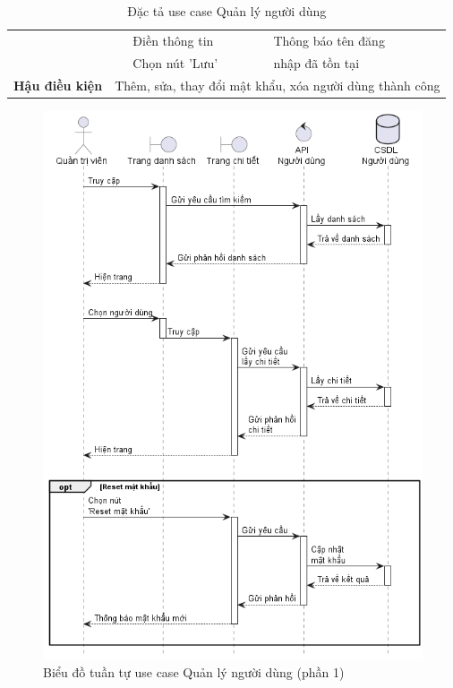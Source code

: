 \documentclass[../DoAn.tex]{subfiles}
\begin{document}
\begin{table}[H]
\begin{tabular}{|l|c|l|l|}
                                                 &                                                                              & Điền thông tin                            & Thông báo tên đăng                              \\
                                                 &                                                                              & Chọn nút 'Lưu'                            & nhập đã tồn tại                                 \\ \hline
        \textbf{Hậu điều kiện}                   & \multicolumn{3}{l|}{Thêm, sửa, thay đổi mật khẩu, xóa người dùng thành công}                                                                                               \\ \hline
    \end{tabular}
    \caption{Đặc tả use case Quản lý người dùng}
    \label{table:uc-user-manage}
\end{table}
\break

\begin{figure}[H]
    \centering
    \includegraphics[width=1\textwidth]{Hinhve/sequences/UserManage1.png}
    \caption{Biểu đồ tuần tự use case Quản lý người dùng (phần 1)}
    \label{figure:sd-user-manage1}
\end{figure}
\break
\end{document}
